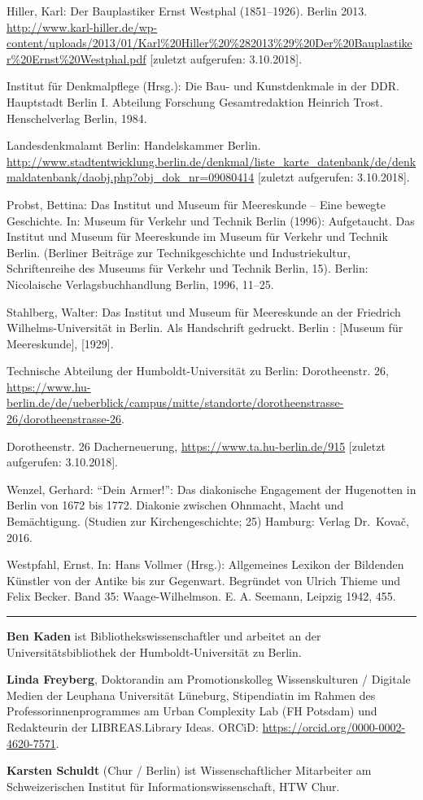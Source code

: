 \documentclass[a4paper,
fontsize=11pt,
oneside,
numbers=noperiodatend,
parskip=half-,
bibliography=totoc,
final
]{scrartcl}
\begin{document}
Hiller, Karl: Der Bauplastiker Ernst Westphal (1851--1926). Berlin 2013.
\url{http://www.karl-hiller.de/wp-content/uploads/2013/01/Karl\%20Hiller\%20\%282013\%29\%20Der\%20Bauplastiker\%20Ernst\%20Westphal.pdf}
{[}zuletzt aufgerufen: 3.10.2018{]}.

Institut für Denkmalpflege (Hrsg.): Die Bau- und Kunstdenkmale in der
DDR. Hauptstadt Berlin I. Abteilung Forschung Gesamtredaktion Heinrich
Trost. Henschelverlag Berlin, 1984.

Landesdenkmalamt Berlin: Handelskammer Berlin.
\url{http://www.stadtentwicklung.berlin.de/denkmal/liste_karte_datenbank/de/denkmaldatenbank/daobj.php?obj_dok_nr=09080414}
{[}zuletzt aufgerufen: 3.10.2018{]}.

Probst, Bettina: Das Institut und Museum für Meereskunde -- Eine bewegte
Geschichte. In: Museum für Verkehr und Technik Berlin (1996):
Aufgetaucht. Das Institut und Museum für Meereskunde im Museum für
Verkehr und Technik Berlin. (Berliner Beiträge zur Technikgeschichte und
Industriekultur, Schriftenreihe des Museums für Verkehr und Technik
Berlin, 15). Berlin: Nicolaische Verlagsbuchhandlung Berlin, 1996,
11--25.

Stahlberg, Walter: Das Institut und Museum für Meereskunde an der
Friedrich Wilhelms-Universität in Berlin. Als Handschrift gedruckt.
Berlin : {[}Museum für Meereskunde{]}, {[}1929{]}.

Technische Abteilung der Humboldt-Universität zu Berlin: Dorotheenstr.
26,
\url{https://www.hu-berlin.de/de/ueberblick/campus/mitte/standorte/dorotheenstrasse-26/dorotheenstrasse-26}.

Dorotheenstr. 26 Dacherneuerung, \url{https://www.ta.hu-berlin.de/915}
{[}zuletzt aufgerufen: 3.10.2018{]}.

Wenzel, Gerhard: \enquote{Dein Armer!}: Das diakonische Engagement der
Hugenotten in Berlin von 1672 bis 1772. Diakonie zwischen Ohnmacht,
Macht und Bemächtigung. (Studien zur Kirchengeschichte; 25) Hamburg:
Verlag Dr.~Kovač, 2016.

Westpfahl, Ernst. In: Hans Vollmer (Hrsg.): Allgemeines Lexikon der
Bildenden Künstler von der Antike bis zur Gegenwart. Begründet von
Ulrich Thieme und Felix Becker. Band 35: Waage-Wilhelmson. E. A.
Seemann, Leipzig 1942, 455.

\begin{center}\rule{0.5\linewidth}{\linethickness}\end{center}

\textbf{Ben Kaden} ist Bibliothekswissenschaftler und arbeitet an der
Universitätsbibliothek der Humboldt-Universität zu Berlin.

\textbf{Linda Freyberg}, Doktorandin am Promotionskolleg Wissenskulturen
/ Digitale Medien der Leuphana Universität Lüneburg, Stipendiatin im
Rahmen des Professorinnenprogrammes am Urban Complexity Lab (FH Potsdam)
und Redakteurin der LIBREAS.Library Ideas. ORCiD:
\url{https://orcid.org/0000-0002-4620-7571}.

\textbf{Karsten Schuldt} (Chur / Berlin) ist Wissenschaftlicher
Mitarbeiter am Schweizerischen Institut für Informationswissenschaft,
HTW Chur.
\end{document}
